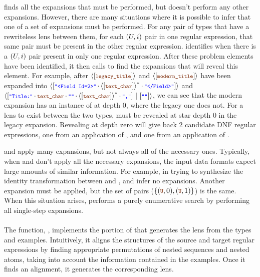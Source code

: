 \documentclass[acmsmall]{acmart}
\begin{document}
\ExpandRequired{} finds all the expansions that must be performed, but doesn't
perform any other expansions.  However, there are many situations where it is
possible to infer that one of a set of expansions must be performed.
For any pair of types that have a rewriteless lens
between them, for each $(U,i)$ pair in one regular expression, that
same pair must be present in the other regular expression.  \FixProblemElts{}
identifies when there is a $(U,i)$ pair present in only one regular
expression.  After these problem elements have been identified, it then calls
\Reveal{} to find the expansions that will reveal this element.  For example,
after $\DNFOf{\SequenceOf{\LegacyTitle{}}}$ and
$\DNFOf{\SequenceOf{\ModernTitle{}}}$ have been expanded into
$\DNFOf{\SequenceOf{\StringCF{"<Field Id=2>"} \SeqSep
    \StarOf{\DNFOf{\SequenceOf{\TextChar}}} \SeqSep
    \StringCF{"</Field>"}}}$
and
$\DNFOf{\SequenceOf{\StringCF{"Title:"} \SeqSep \TextChar
    \SeqSep \StringCF{""}
    \SeqSep \StarOf{\DNFOf{\SequenceOf{\TextChar}}}
    \SeqSep \StringCF{","}}
  \DNFSep
  \SequenceOf{\StringCF{""}}}$, we can see that the modern expansion
has an instance of \TextChar{} at depth 0, where the legacy one does not.
For a lens to exist between the two types,
\TextChar{} must be revealed at star depth 0 in the legacy expansion.
Revealing \TextChar{} at depth zero will give back 2 candidate DNF
regular expressions,
one from an application of
\AtomUnrollstarLeftRule{}, and one from an application of
\AtomUnrollstarRightRule{}.

\FixProblemElts{} and \ExpandRequired{} apply many expansions, but not always
all of the necessary ones.
Typically, when \FixProblemElts{} and \ExpandRequired{} don't apply all the
necessary expansions, the input data formats expect large amounts of similar
information.
For example, in trying to synthesize the identity
transformation between \CF{\textcolor{blue}{""} | \textcolor{darkbrown}{U} |
  \textcolor{darkbrown}{UU}(\textcolor{darkbrown}{U}*)} and
\CF{\textcolor{blue}{""} | \textcolor{darkbrown}{U}(\textcolor{darkbrown}{U}*)},
\ExpandRequired{} and \FixProblemElts{} infer no expansions.
Another expansion must be applied, but the set of pairs
($\SetOf{(\VarCF{U},0),(\VarCF{U},1)}$) is the same.  When this situation
arises, \ExpandOnce{} performs a purely enumerative search by performing all
single-step expansions.

\paragraph*{\RigidSynth} 
The function, \RigidSynth{}, implements the portion of \SynthLens{} that
generates the lens from the types and examples.
Intuitively, it aligns the structures of the source and target regular
expressions by finding appropriate permutations of nested sequences
and nested atoms, taking into account the information contained in the
examples.  Once it finds an alignment, it generates the
corresponding lens. 
\end{document}
